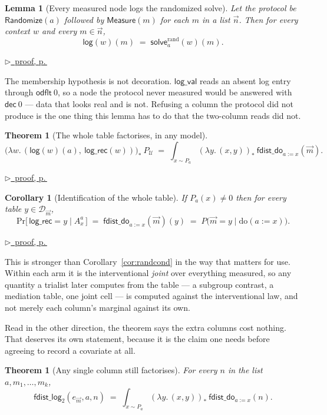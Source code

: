 \documentclass[11pt,a4paper]{article}
\theoremstyle{definition}
\theoremstyle{plain}
\newtheorem{theorem}[definition]{Theorem}
\newtheorem{lemma}[definition]{Lemma}
\newtheorem{corollary}[definition]{Corollary}
\theoremstyle{remark}
\newcommand{\dom}{\mathcal{D}}
\newcommand{\Ctx}{\mathcal{U}}         %
\newcommand{\solve}{\mathsf{solve}}
\newcommand{\fdo}{\mathsf{fdist\_do}}
\newcommand{\push}[1]{{#1}_{*}}        %
\renewcommand{\Pr}{\mathrm{Pr}}
\newcommand{\pfref}[1]{%
  \par\smallskip\noindent
  \hyperref[pf:#1]{\small$\triangleright$\ proof, p.\,\pageref{pf:#1}}\par\smallskip}
\begin{document}
\begin{lemma}[Every measured node logs the randomized solve]
\label{lem:logrand}
Let the protocol be $\mathsf{Randomize}(a)$ followed by
$\mathsf{Measure}(m)$ for each $m$ in a list $\vec n$. Then for every
context $w$ and every $m \in \vec n$,
\[
  \mathsf{log}(w)(m) \;=\; \solve^{\mathrm{rand}}_a(w)(m) .
\]
\end{lemma}

\pfref{lem:logrand}

The membership hypothesis is not decoration. $\mathsf{log\_val}$ reads an
absent log entry through $\mathsf{odflt}\ 0$, so a node the protocol never
measured would be answered with $\mathsf{dec}\ 0$ --- data that looks real
and is not. Refusing a column the protocol did not produce is the one
thing this lemma has to do that the two-column reads did not.

\begin{theorem}[The whole table factorises, in any model]
\label{thm:randmanyjoint}
\[
  \push{\bigl(\lambda w.\,(\mathsf{log}(w)(a),\ \mathsf{log\_rec}(w))\bigr)}\ P_\Ctx
  \;=\;
  \int_{x \sim P_a} \push{(\lambda y.\,(x,y))}\ \fdo_{a := x}(\vec m) .
\]
\end{theorem}

\pfref{thm:randmanyjoint}

\begin{corollary}[Identification of the whole table]
\label{cor:randmanycond}
If $P_a(x) \neq 0$ then for every table $y \in \dom_{\vec m}$,
\[
  \Pr\bigl[\,\mathsf{log\_rec} = y \;\big|\; A^{a}_x\,\bigr]
  \;=\; \fdo_{a := x}(\vec m)(y)
  \;=\; P\bigl(\vec m = y \mid \mathrm{do}(a := x)\bigr).
\]
\end{corollary}

\pfref{cor:randmanycond}

This is stronger than Corollary~\ref{cor:randcond} in the way that
matters for use. Within each arm it is the interventional \emph{joint}
over everything measured, so any quantity a trialist later computes from
the table --- a subgroup contrast, a mediation table, one joint cell ---
is computed against the interventional law, and not merely each column's
marginal against its own.

Read in the other direction, the theorem says the extra columns cost
nothing. That deserves its own statement, because it is the claim one
needs before agreeing to record a covariate at all.

\begin{theorem}[Any single column still factorises]
\label{thm:randmanypair}
For every $n$ in the list $a,m_1,\dots,m_k$,
\[
  \mathsf{fdist\_log}_2(e_{\vec m}, a, n)
  \;=\;
  \int_{x \sim P_a} \push{(\lambda y.\,(x,y))}\ \fdo_{a := x}(n) .
\]
\end{theorem}
\end{document}
